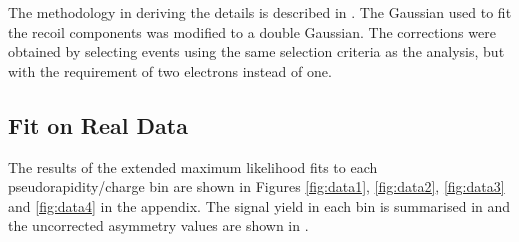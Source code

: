 The methodology in deriving the details is described in .
The Gaussian used to fit the recoil components was modified to a double
Gaussian. 
The corrections were obtained by selecting \HepProcess{\PZ\to\Pe\Pe} events
using the same selection criteria as the analysis, but with the requirement of
two electrons instead of one.

\subsection{Fit on Real Data}
The results of the extended maximum likelihood fits to each pseudorapidity/charge
bin are shown in Figures \ref{fig:data1}, \ref{fig:data2}, \ref{fig:data3} and
\ref{fig:data4} in the appendix.
The signal yield in each bin is summarised in  and
the uncorrected asymmetry values are shown in .

